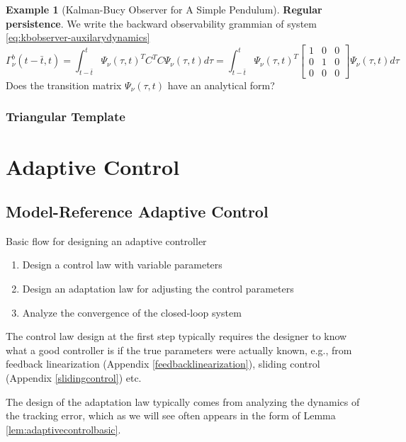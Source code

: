 \documentclass[
]{book}
\theoremstyle{definition}
\theoremstyle{definition}
\newtheorem{example}{Example}[chapter]
\theoremstyle{definition}
\theoremstyle{definition}
\theoremstyle{remark}
\begin{document}
\begin{example}[Kalman-Bucy Observer for A Simple Pendulum]
\textbf{Regular persistence}. We write the backward observability grammian of system \eqref{eq:kbobserver-auxilarydynamics}
\[
\Gamma_\nu^b(t - \bar{t},t) = \int_{t - \bar{t}}^t \Psi_\nu(\tau,t)^T C^T C \Psi_\nu (\tau, t) d \tau = \int_{t - \bar{t}}^t \Psi_\nu(\tau,t)^T \begin{bmatrix} 
1 & 0 & 0 \\
0 & 1 & 0 \\
0 & 0 & 0
\end{bmatrix}
\Psi_\nu (\tau, t) d \tau
\]
{Does the transition matrix \(\Psi_\nu (\tau, t)\) have an analytical form?}
\end{example}

\hypertarget{triangular-template}{%
\subsection{Triangular Template}\label{triangular-template}}

\hypertarget{adaptivecontrol}{%
\chapter{Adaptive Control}\label{adaptivecontrol}}

\hypertarget{model-reference-adaptive-control}{%
\section{Model-Reference Adaptive Control}\label{model-reference-adaptive-control}}

Basic flow for designing an adaptive controller

\begin{enumerate}
\def\labelenumi{\arabic{enumi}.}
\item
  Design a control law with variable parameters
\item
  Design an adaptation law for adjusting the control parameters
\item
  Analyze the convergence of the closed-loop system
\end{enumerate}

The control law design at the first step typically requires the designer to know what a good controller is if the true parameters were actually known, e.g., from feedback linearization (Appendix \ref{feedbacklinearization}), sliding control (Appendix \ref{slidingcontrol}) etc.

The design of the adaptation law typically comes from analyzing the dynamics of the tracking error, which as we will see often appears in the form of Lemma \ref{lem:adaptivecontrolbasic}.
\end{document}
